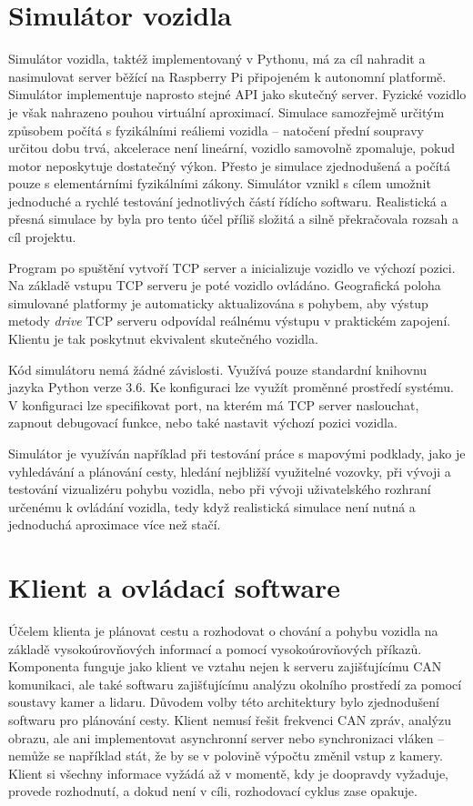 \documentclass[czech, bachelor]{diploma}
\begin{document}
\chapter{Simulátor vozidla}

Simulátor vozidla, taktéž implementovaný v Pythonu, má za cíl nahradit a nasimulovat server běžící na Raspberry Pi připojeném
k autonomní platformě. Simulátor implementuje naprosto stejné API jako skutečný server. Fyzické vozidlo je však nahrazeno pouhou
virtuální aproximací. Simulace samozřejmě určitým způsobem počítá s fyzikálními reáliemi vozidla -- natočení přední soupravy
určitou dobu trvá, akcelerace není lineární, vozidlo samovolně zpomaluje, pokud motor neposkytuje dostatečný výkon. Přesto je
simulace zjednodušená a počítá pouze s elementárními fyzikálními zákony. Simulátor vznikl s cílem umožnit jednoduché a rychlé
testování jednotlivých částí řídícho softwaru. Realistická a přesná simulace by byla pro tento účel příliš složitá a silně
překračovala rozsah a cíl projektu.

Program po spuštění vytvoří TCP server a inicializuje vozidlo ve výchozí pozici. Na základě vstupu TCP serveru je poté vozidlo
ovládáno. Geografická poloha simulované platformy je automaticky aktualizována s pohybem, aby výstup metody \emph{drive} TCP
serveru odpovídal reálnému výstupu v praktickém zapojení. Klientu je tak poskytnut ekvivalent skutečného vozidla.

Kód simulátoru nemá žádné závislosti. Využívá pouze standardní knihovnu jazyka Python verze 3.6. Ke konfiguraci lze využít
proměnné prostředí systému. V konfiguraci lze specifikovat port, na kterém má TCP server naslouchat, zapnout debugovací funkce,
nebo také nastavit výchozí pozici vozidla.

Simulátor je využíván například při testování práce s mapovými podklady, jako je vyhledávání a plánování cesty, hledání nejbližší
využitelné vozovky, při vývoji a testování vizualizéru pohybu vozidla, nebo při vývoji uživatelského rozhraní určenému k ovládání
vozidla, tedy když realistická simulace není nutná a jednoduchá aproximace více než stačí.

\chapter{Klient a ovládací software}

Účelem klienta je plánovat cestu a rozhodovat o chování a pohybu vozidla na základě vysokoúrovňových informací a pomocí
vysokoúrovňových příkazů. Komponenta funguje jako klient ve vztahu nejen k serveru zajišťujícímu CAN komunikaci, ale také
softwaru zajišťujícímu analýzu okolního prostředí za pomocí soustavy kamer a lidaru. Důvodem volby této architektury bylo
zjednodušení softwaru pro plánování cesty. Klient nemusí řešit frekvenci CAN zpráv, analýzu obrazu, ale ani implementovat
asynchronní server nebo synchronizaci vláken -- nemůže se například stát, že by se v polovině výpočtu změnil vstup z kamery.
Klient si všechny informace vyžádá až v momentě, kdy je doopravdy vyžaduje, provede rozhodnutí, a dokud není v cíli, rozhodovací
cyklus zase opakuje.
\end{document}
